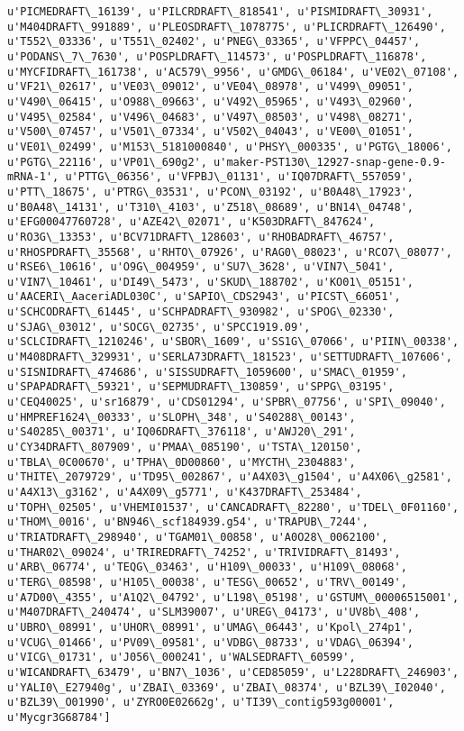 \documentclass[11pt]{article}
\begin{document}
\begin{Verbatim}[commandchars=\\\{\}]
u'PICMEDRAFT\_16139', u'PILCRDRAFT\_818541', u'PISMIDRAFT\_30931', u'M404DRAFT\_991889', u'PLEOSDRAFT\_1078775', u'PLICRDRAFT\_126490', u'T552\_03336', u'T551\_02402', u'PNEG\_03365', u'VFPPC\_04457', u'PODANS\_7\_7630', u'POSPLDRAFT\_114573', u'POSPLDRAFT\_116878', u'MYCFIDRAFT\_161738', u'AC579\_9956', u'GMDG\_06184', u'VE02\_07108', u'VF21\_02617', u'VE03\_09012', u'VE04\_08978', u'V499\_09051', u'V490\_06415', u'O988\_09663', u'V492\_05965', u'V493\_02960', u'V495\_02584', u'V496\_04683', u'V497\_08503', u'V498\_08271', u'V500\_07457', u'V501\_07334', u'V502\_04043', u'VE00\_01051', u'VE01\_02499', u'M153\_5181000840', u'PHSY\_000335', u'PGTG\_18006', u'PGTG\_22116', u'VP01\_690g2', u'maker-PST130\_12927-snap-gene-0.9-mRNA-1', u'PTTG\_06356', u'VFPBJ\_01131', u'IQ07DRAFT\_557059', u'PTT\_18675', u'PTRG\_03531', u'PCON\_03192', u'B0A48\_17923', u'B0A48\_14131', u'T310\_4103', u'Z518\_08689', u'BN14\_04748', u'EFG00047760728', u'AZE42\_02071', u'K503DRAFT\_847624', u'RO3G\_13353', u'BCV71DRAFT\_128603', u'RHOBADRAFT\_46757', u'RHOSPDRAFT\_35568', u'RHTO\_07926', u'RAG0\_08023', u'RCO7\_08077', u'RSE6\_10616', u'O9G\_004959', u'SU7\_3628', u'VIN7\_5041', u'VIN7\_10461', u'DI49\_5473', u'SKUD\_188702', u'KO01\_05151', u'AACERI\_AaceriADL030C', u'SAPIO\_CDS2943', u'PICST\_66051', u'SCHCODRAFT\_61445', u'SCHPADRAFT\_930982', u'SPOG\_02330', u'SJAG\_03012', u'SOCG\_02735', u'SPCC1919.09', u'SCLCIDRAFT\_1210246', u'SBOR\_1609', u'SS1G\_07066', u'PIIN\_00338', u'M408DRAFT\_329931', u'SERLA73DRAFT\_181523', u'SETTUDRAFT\_107606', u'SISNIDRAFT\_474686', u'SISSUDRAFT\_1059600', u'SMAC\_01959', u'SPAPADRAFT\_59321', u'SEPMUDRAFT\_130859', u'SPPG\_03195', u'CEQ40025', u'sr16879', u'CDS01294', u'SPBR\_07756', u'SPI\_09040', u'HMPREF1624\_00333', u'SLOPH\_348', u'S40288\_00143', u'S40285\_00371', u'IQ06DRAFT\_376118', u'AWJ20\_291', u'CY34DRAFT\_807909', u'PMAA\_085190', u'TSTA\_120150', u'TBLA\_0C00670', u'TPHA\_0D00860', u'MYCTH\_2304883', u'THITE\_2079729', u'TD95\_002867', u'A4X03\_g1504', u'A4X06\_g2581', u'A4X13\_g3162', u'A4X09\_g5771', u'K437DRAFT\_253484', u'TOPH\_02505', u'VHEMI01537', u'CANCADRAFT\_82280', u'TDEL\_0F01160', u'THOM\_0016', u'BN946\_scf184939.g54', u'TRAPUB\_7244', u'TRIATDRAFT\_298940', u'TGAM01\_00858', u'A0O28\_0062100', u'THAR02\_09024', u'TRIREDRAFT\_74252', u'TRIVIDRAFT\_81493', u'ARB\_06774', u'TEQG\_03463', u'H109\_00033', u'H109\_08068', u'TERG\_08598', u'H105\_00038', u'TESG\_00652', u'TRV\_00149', u'A7D00\_4355', u'A1Q2\_04792', u'L198\_05198', u'GSTUM\_00006515001', u'M407DRAFT\_240474', u'SLM39007', u'UREG\_04173', u'UV8b\_408', u'UBRO\_08991', u'UHOR\_08991', u'UMAG\_06443', u'Kpol\_274p1', u'VCUG\_01466', u'PV09\_09581', u'VDBG\_08733', u'VDAG\_06394', u'VICG\_01731', u'J056\_000241', u'WALSEDRAFT\_60599', u'WICANDRAFT\_63479', u'BN7\_1036', u'CED85059', u'L228DRAFT\_246903', u'YALI0\_E27940g', u'ZBAI\_03369', u'ZBAI\_08374', u'BZL39\_I02040', u'BZL39\_O01990', u'ZYRO0E02662g', u'TI39\_contig593g00001', u'Mycgr3G68784']

\end{Verbatim}
\end{document}
